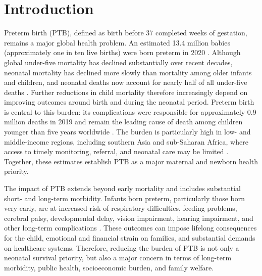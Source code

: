 \documentclass[10pt,letterpaper]{article}
\begin{document}

%




\section*{Introduction}
Preterm birth (PTB), defined as birth before 37 completed weeks of gestation, remains a major global health problem. An estimated 13.4 million babies (approximately one in ten live births) were born preterm in 2020 \cite{Ohuma2023,WHO_preterm_2023}. Although global under-five mortality has declined substantially over recent decades, neonatal mortality has declined more slowly than mortality among older infants and children, and neonatal deaths now account for nearly half of all under-five deaths \cite{WHO_newborn_2024,UNICEF_neonatal_2026}. Further reductions in child mortality therefore increasingly depend on improving outcomes around birth and during the neonatal period. Preterm birth is central to this burden: its complications were responsible for approximately 0.9 million deaths in 2019 and remain the leading cause of death among children younger than five years worldwide \cite{WHO_preterm_2023}. The burden is particularly high in low- and middle-income regions, including southern Asia and sub-Saharan Africa, where access to timely monitoring, referral, and neonatal care may be limited \cite{WHO_newborn_2024,WHO_preterm_2023}. Together, these estimates establish PTB as a major maternal and newborn health priority.

The impact of PTB extends beyond early mortality and includes substantial short- and long-term morbidity. Infants born preterm, particularly those born very early, are at increased risk of respiratory difficulties, feeding problems, cerebral palsy, developmental delay, vision impairment, hearing impairment, and other long-term complications \cite{CDC_preterm_2024}. These outcomes can impose lifelong consequences for the child, emotional and financial strain on families, and substantial demands on healthcare systems. Therefore, reducing the burden of PTB is not only a neonatal survival priority, but also a major concern in terms of long-term morbidity, public health, socioeconomic burden, and family welfare.
\end{document}
